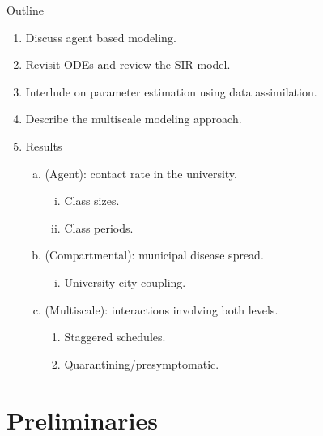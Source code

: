 \documentclass[aspectratio=169]{beamer}
\begin{document}
\begin{frame}{Outline}
\vfill
\center
    \begin{enumerate}[1.]
    \pause
        \item Discuss agent based modeling.
        
        \pause
        \item Revisit ODEs and review the SIR model.
        
        \pause
        \item Interlude on parameter estimation using data assimilation.
        
        \pause
        \item Describe the multiscale modeling approach.
        
        \pause
        \item Results
        \begin{enumerate}[a.]
        \pause
            \item (Agent): contact rate in the university.
            \begin{enumerate}[i.]
            \pause
                \item Class sizes.
                
                \pause
                \item Class periods.
            \end{enumerate}
            \pause
            \item (Compartmental): municipal disease spread.
            \begin{enumerate}[i.]
            \pause
                \item University-city coupling.
            \end{enumerate}
            \pause
            \item (Multiscale): interactions involving both levels.
            \begin{enumerate}[i]
            \pause
                \item Staggered schedules.
                
                \pause
                \item Quarantining/presymptomatic.
            \end{enumerate}
        \end{enumerate}
    \end{enumerate}
\vfill
\end{frame}

\section{Preliminaries}
\end{document}

